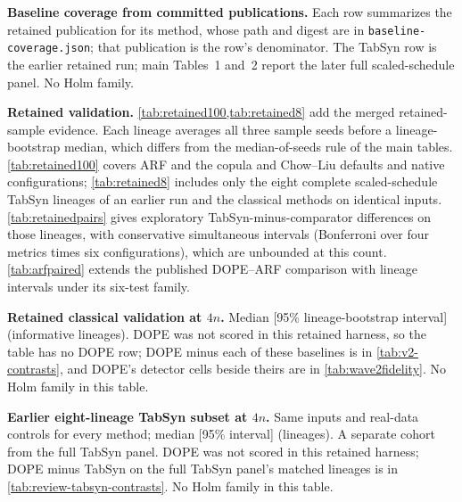 \documentclass{article}
\begin{document}
\begin{table}[t]
\caption{\textbf{Baseline coverage from committed publications.} Each row summarizes the retained publication for its method, whose path and digest are in \texttt{baseline-coverage.json}; that publication is the row's denominator. The TabSyn row is the earlier retained run; main Tables~1 and~2 report the later full scaled-schedule panel. No Holm family.}
\label{tab:baselinecoverage}
\centering\footnotesize\setlength{\tabcolsep}{3pt}
\resizebox{\linewidth}{!}{\begin{minipage}{7.16in}\end{minipage}}
\end{table}

\textbf{Retained validation.} \cref{tab:retained100,tab:retained8} add the merged retained-sample evidence. Each lineage averages all three sample seeds before a lineage-bootstrap median, which differs from the median-of-seeds rule of the main tables. \cref{tab:retained100} covers ARF and the copula and Chow--Liu defaults and native configurations; \cref{tab:retained8} includes only the eight complete scaled-schedule TabSyn lineages of an earlier run and the classical methods on identical inputs. \cref{tab:retainedpairs} gives exploratory TabSyn-minus-comparator differences on those lineages, with conservative simultaneous intervals (Bonferroni over four metrics times six configurations), which are unbounded at this count. \cref{tab:arfpaired} extends the published DOPE--ARF comparison with lineage intervals under its six-test family.

\begin{table}[t]
\caption{\textbf{Retained classical validation at $4n$.} Median [95\% lineage-bootstrap interval] (informative lineages). DOPE was not scored in this retained harness, so the table has no DOPE row; DOPE minus each of these baselines is in \cref{tab:v2-contrasts}, and DOPE's detector cells beside theirs are in \cref{tab:wave2fidelity}. No Holm family in this table.}
\label{tab:retained100}
\centering\footnotesize\setlength{\tabcolsep}{3pt}
\resizebox{\linewidth}{!}{\begin{minipage}{7.16in}\end{minipage}}
\end{table}

\begin{table}[t]
\caption{\textbf{Earlier eight-lineage TabSyn subset at $4n$.} Same inputs and real-data controls for every method; median [95\% interval] (lineages). A separate cohort from the full TabSyn panel. DOPE was not scored in this retained harness; DOPE minus TabSyn on the full TabSyn panel's matched lineages is in \cref{tab:review-tabsyn-contrasts}. No Holm family in this table.}
\label{tab:retained8}
\centering\footnotesize\setlength{\tabcolsep}{3pt}
\resizebox{\linewidth}{!}{\begin{minipage}{7.16in}\end{minipage}}
\end{table}
\end{document}
